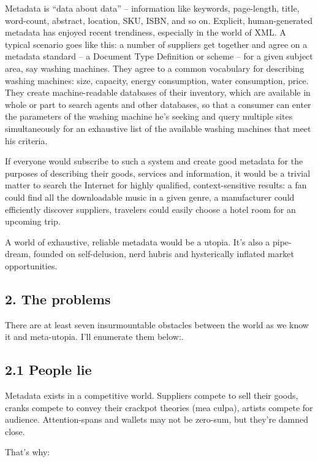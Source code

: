 Metadata is ``data about data'' -- information like keywords,
page-length, title, word-count, abstract, location, SKU, ISBN, and
so on. Explicit, human-generated metadata has enjoyed recent
trendiness, especially in the world of XML. A typical scenario goes
like this: a number of suppliers get together and agree on a
metadata standard -- a Document Type Definition or scheme -- for a
given subject area, say washing machines. They agree to a common
vocabulary for describing washing machines: size, capacity, energy
consumption, water consumption, price. They create machine-readable
databases of their inventory, which are available in whole or part
to search agents and other databases, so that a consumer can enter
the parameters of the washing machine he's seeking and query
multiple sites simultaneously for an exhaustive list of the
available washing machines that meet his criteria.

If everyone would subscribe to such a system and create good
metadata for the purposes of describing their goods, services and
information, it would be a trivial matter to search the Internet
for highly qualified, context-sensitive results: a fan could find
all the downloadable music in a given genre, a manufacturer could
efficiently discover suppliers, travelers could easily choose a
hotel room for an upcoming trip.

A world of exhaustive, reliable metadata would be a utopia. It's
also a pipe-dream, founded on self-delusion, nerd hubris and
hysterically inflated market opportunities.

\subsection{2. The problems}

There are at least seven insurmountable obstacles between the world
as we know it and meta-utopia. I'll enumerate them below:.

\subsection{2.1 People lie}

Metadata exists in a competitive world. Suppliers compete to sell
their goods, cranks compete to convey their crackpot theories (mea
culpa), artists compete for audience. Attention-spans and wallets
may not be zero-sum, but they're damned close.

That's why:

